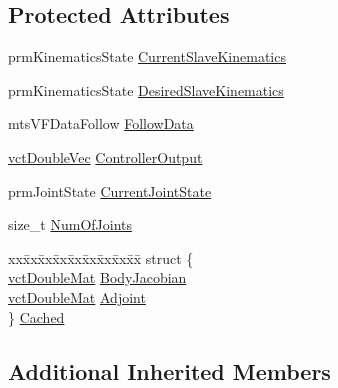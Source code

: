 \subsection*{Protected Attributes}
\begin{DoxyCompactItemize}
\item 
prm\-Kinematics\-State \hyperlink{classmts_intuitive_research_kit_optimizer_a10517be9e248c92c46501f6eea30433c}{Current\-Slave\-Kinematics}
\item 
prm\-Kinematics\-State \hyperlink{classmts_intuitive_research_kit_optimizer_a095ebf16dfbac51a8d8c24830824b856}{Desired\-Slave\-Kinematics}
\item 
mts\-V\-F\-Data\-Follow \hyperlink{classmts_intuitive_research_kit_optimizer_a08aabafa6727fbfa54b229e0faa21bdf}{Follow\-Data}
\item 
\hyperlink{vct_dynamic_vector_types_8h_ade4b3068c86fb88f41af2e5187e491c2}{vct\-Double\-Vec} \hyperlink{classmts_intuitive_research_kit_optimizer_ac33e4d294b5b6abee6863f070b477c42}{Controller\-Output}
\item 
prm\-Joint\-State \hyperlink{classmts_intuitive_research_kit_optimizer_ad436ec7283125c4598fcb243f0354e29}{Current\-Joint\-State}
\item 
size\-\_\-t \hyperlink{classmts_intuitive_research_kit_optimizer_aa64f574f639972c9ef2ce46db04c48f6}{Num\-Of\-Joints}
\item 
\begin{tabbing}
xx\=xx\=xx\=xx\=xx\=xx\=xx\=xx\=xx\=\kill
struct \{\\
\>\hyperlink{vct_dynamic_matrix_types_8h_a48f1eb2461d20a99e824ee5753a37c84}{vctDoubleMat} \hyperlink{classmts_intuitive_research_kit_optimizer_abfe8527a15da180a73c60e761ac889bb}{BodyJacobian}\\
\>\hyperlink{vct_dynamic_matrix_types_8h_a48f1eb2461d20a99e824ee5753a37c84}{vctDoubleMat} \hyperlink{classmts_intuitive_research_kit_optimizer_a84bd5de92e87e58310b54fa83fe8faf3}{Adjoint}\\
\} \hyperlink{classmts_intuitive_research_kit_optimizer_a0c5d3938b0cbe1ebbd88c277829943af}{Cached}\\

\end{tabbing}\end{DoxyCompactItemize}
\subsection*{Additional Inherited Members}



